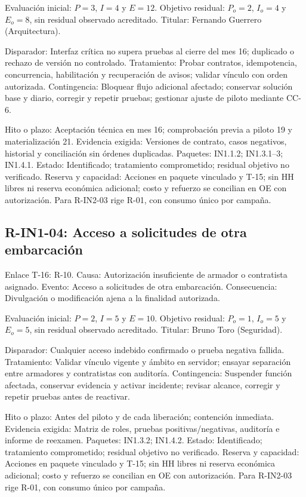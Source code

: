 Evaluación inicial: $P=3$, $I=4$ y $E=12$. Objetivo residual: $P_o=2$, $I_o=4$ y $E_o=8$, sin residual observado acreditado. Titular: Fernando Guerrero (Arquitectura).

Disparador: Interfaz crítica no supera pruebas al cierre del mes 16; duplicado o rechazo de versión no controlado. Tratamiento: Probar contratos, idempotencia, concurrencia, habilitación y recuperación de avisos; validar vínculo con orden autorizada. Contingencia: Bloquear flujo adicional afectado; conservar solución base y diario, corregir y repetir pruebas; gestionar ajuste de piloto mediante CC-6.

Hito o plazo: Aceptación técnica en mes 16; comprobación previa a piloto 19 y materialización 21. Evidencia exigida: Versiones de contrato, casos negativos, historial y conciliación sin órdenes duplicadas. Paquetes: IN1.1.2; IN1.3.1--3; IN1.4.1. Estado: Identificado; tratamiento comprometido; residual objetivo no verificado. Reserva y capacidad: Acciones en paquete vinculado y T-15; sin HH libres ni reserva económica adicional; costo y refuerzo se concilian en OE con autorización. Para R-IN2-03 rige R-01, con consumo único por campaña.

\subsection{R-IN1-04: Acceso a solicitudes de otra embarcación}
Enlace T-16: R-10. Causa: Autorización insuficiente de armador o contratista asignado. Evento: Acceso a solicitudes de otra embarcación. Consecuencia: Divulgación o modificación ajena a la finalidad autorizada.

Evaluación inicial: $P=2$, $I=5$ y $E=10$. Objetivo residual: $P_o=1$, $I_o=5$ y $E_o=5$, sin residual observado acreditado. Titular: Bruno Toro (Seguridad).

Disparador: Cualquier acceso indebido confirmado o prueba negativa fallida. Tratamiento: Validar vínculo vigente y ámbito en servidor; ensayar separación entre armadores y contratistas con auditoría. Contingencia: Suspender función afectada, conservar evidencia y activar incidente; revisar alcance, corregir y repetir pruebas antes de reactivar.

Hito o plazo: Antes del piloto y de cada liberación; contención inmediata. Evidencia exigida: Matriz de roles, pruebas positivas/negativas, auditoría e informe de reexamen. Paquetes: IN1.3.2; IN1.4.2. Estado: Identificado; tratamiento comprometido; residual objetivo no verificado. Reserva y capacidad: Acciones en paquete vinculado y T-15; sin HH libres ni reserva económica adicional; costo y refuerzo se concilian en OE con autorización. Para R-IN2-03 rige R-01, con consumo único por campaña.

